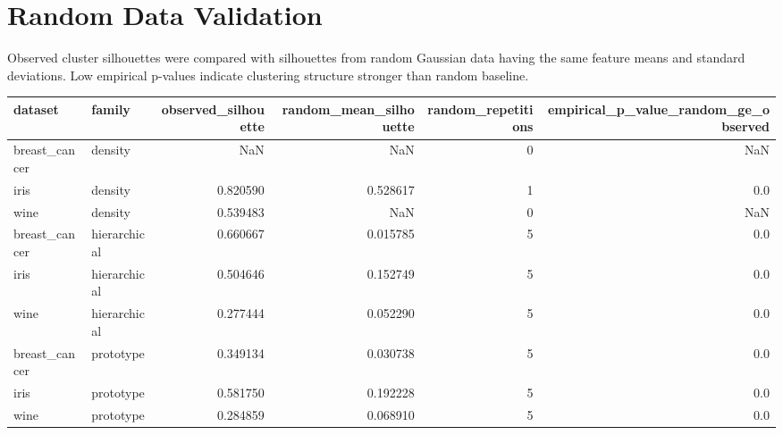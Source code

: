 \documentclass[11pt]{article}
\begin{document}
\section*{Random Data Validation}
Observed cluster silhouettes were compared with silhouettes from random Gaussian data having the same feature means and standard deviations. Low empirical p-values indicate clustering structure stronger than random baseline.
\begin{tabular}{llrrrr}
\toprule
       dataset &        family &  observed\_silhouette &  random\_mean\_silhouette &  random\_repetitions &  empirical\_p\_value\_random\_ge\_observed \\
\midrule
 breast\_cancer &       density &                  NaN &                     NaN &                   0 &                                   NaN \\
          iris &       density &             0.820590 &                0.528617 &                   1 &                                   0.0 \\
          wine &       density &             0.539483 &                     NaN &                   0 &                                   NaN \\
 breast\_cancer &  hierarchical &             0.660667 &                0.015785 &                   5 &                                   0.0 \\
          iris &  hierarchical &             0.504646 &                0.152749 &                   5 &                                   0.0 \\
          wine &  hierarchical &             0.277444 &                0.052290 &                   5 &                                   0.0 \\
 breast\_cancer &     prototype &             0.349134 &                0.030738 &                   5 &                                   0.0 \\
          iris &     prototype &             0.581750 &                0.192228 &                   5 &                                   0.0 \\
          wine &     prototype &             0.284859 &                0.068910 &                   5 &                                   0.0 \\
\bottomrule
\end{tabular}
\end{document}
